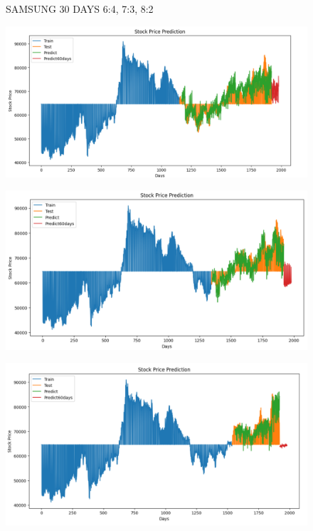 \documentclass{article}
\begin{document}
\begin{multicols}{2}
\begin{figure}[H]
\begin{minipage}{0.15\textwidth}
    \label{fig:3}
    \end{minipage}
    \caption{SAMSUNG 30 DAYS  6:4, 7:3, 8:2 }
\end{figure}


\begin{figure}[H]
    \centering
    \begin{minipage}{0.15\textwidth}
    \centering
    \includegraphics[width=1\textwidth]{Image/N_Beat/N_BEAT_6_4_SAMSUNG_60DAYS.png}
   
    \label{fig:1}
    \end{minipage}%
    \begin{minipage}{0.15\textwidth}
    \centering
    \includegraphics[width=1\textwidth]{Image/N_Beat/N_BEAT_7_3_SAMSUNG_60DAYS.png}
  
    \label{fig:2}
    \end{minipage}%
    \begin{minipage}{0.15\textwidth}
    \centering
    \includegraphics[width=1\textwidth]{Image/N_Beat/N_BEAT_8_2_SAMSUNG_60DAYS.png}


\end{minipage}
\end{figure}
\end{multicols}
\end{document}

